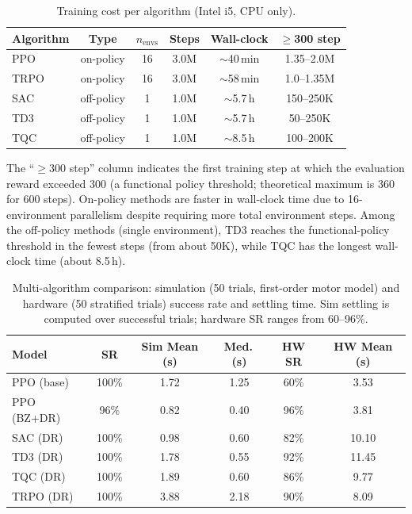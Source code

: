 \begin{table}[!t]
\centering
\renewcommand{\arraystretch}{1.15}
\caption{Training cost per algorithm (Intel i5, CPU only).}
\label{tab:rl_training_cost}
\begin{tabular}{lccccc}
\toprule
\textbf{Algorithm} & \textbf{Type} & \textbf{$n_\text{envs}$}
  & \textbf{Steps} & \textbf{Wall-clock} & \textbf{$\geq$300 step} \\
\midrule
PPO   & on-policy  & 16 & 3.0M & $\sim$40\,min   & 1.35--2.0M \\
TRPO  & on-policy  & 16 & 3.0M & $\sim$58\,min   & 1.0--1.35M \\
SAC   & off-policy &  1 & 1.0M & $\sim$5.7\,h    & 150--250K \\
TD3   & off-policy &  1 & 1.0M & $\sim$5.7\,h    & 50--250K \\
TQC   & off-policy &  1 & 1.0M & $\sim$8.5\,h  & 100--200K \\
\bottomrule
\end{tabular}
\end{table}

\noindent
The ``$\geq$300 step'' column indicates the first training step at which
the evaluation reward exceeded 300 (a functional policy threshold;
theoretical maximum is 360 for 600 steps).
On-policy methods are faster in wall-clock time due to 16-environment
parallelism despite requiring more total environment steps.
Among the off-policy methods (single environment), TD3 reaches the
functional-policy threshold in the fewest steps (from about 50K), while
TQC has the longest wall-clock time (about 8.5\,h).

\begin{table}[!t]
\centering
\renewcommand{\arraystretch}{1.15}
\caption{Multi-algorithm comparison: simulation (50 trials, first-order motor model)
  and hardware (50 stratified trials) success rate and settling time.
  Sim settling is computed over successful trials; hardware SR ranges from 60--96\%.}
\label{tab:rl_comparison}
\begin{tabular}{lccccc}
\toprule
\textbf{Model} & \textbf{SR} & \textbf{Sim Mean (s)} & \textbf{Med.\,(s)}
  & \textbf{HW SR} & \textbf{HW Mean (s)} \\
\midrule
PPO (base)  & 100\% & 1.72 & 1.25 & 60\%  & 3.53 \\
PPO (BZ+DR) &  96\% & 0.82 & 0.40 & 96\%  & 3.81 \\
SAC (DR)    & 100\% & 0.98 & 0.60 & 82\%  & 10.10 \\
TD3 (DR)    & 100\% & 1.78 & 0.55 & 92\%  & 11.45 \\
TQC (DR)    & 100\% & 1.89 & 0.60 & 86\%  & 9.77 \\
TRPO (DR)   & 100\% & 3.88 & 2.18 & 90\%  & 8.09 \\
\bottomrule
\end{tabular}
\end{table}

